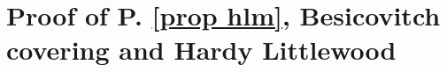 


\chapter{Proof of P. \ref{prop hlm}, Besicovitch covering and Hardy Littlewood}
\label{sec hlm}

